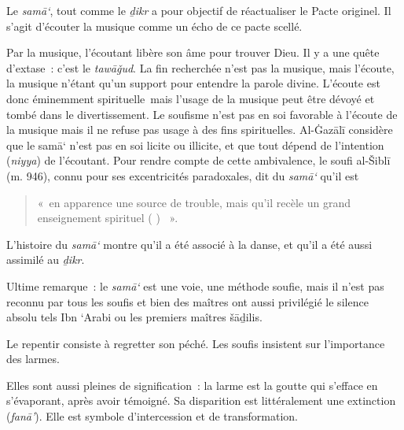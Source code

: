\begin{Def}[{samā`}]
Le \emph{samā`}, tout comme le \emph{ḏikr} a pour objectif de
réactualiser le Pacte originel. Il s'agit d'écouter la musique comme un
écho de ce pacte scellé. 
\end{Def}
Par la musique, l'écoutant libère son âme pour
trouver Dieu. Il y a une quête d'extase~: c'est le \emph{tawāǧud}. La
fin recherchée n'est pas la musique, mais l'écoute, la musique n'étant
qu'un support pour entendre la parole divine. L'écoute est donc
éminemment spirituelle~mais l'usage de la musique peut être dévoyé et
tombé dans le divertissement. Le soufisme n'est pas en soi favorable à
l'écoute de la musique mais il ne refuse pas usage à des fins
spirituelles. Al-Ġazālī  \label{theol:AlGazali28} considère que le samā` n'est pas en soi licite
ou illicite, et que tout dépend de l'intention (\emph{niyya}) de
l'écoutant. Pour rendre compte de cette ambivalence, le soufi al-Šiblī
(m. 946), connu pour ses excentricités paradoxales, dit du \emph{samā`}
qu'il est 
\begin{quote}
    «~en apparence une source de trouble, mais qu'il recèle un
grand enseignement spirituel (
)
~».
\end{quote}

L'histoire du \emph{samā`} montre qu'il a été associé à la danse, et
qu'il a été aussi assimilé au \emph{ḏikr}.

Ultime remarque~: le \emph{samā`} est une voie, une méthode soufie, mais
il n'est pas reconnu par tous les soufis et bien des maîtres ont aussi
privilégié le silence absolu tels Ibn `Arabi ou les premiers maîtres
šāḏilis.


Le repentir consiste à regretter son péché. Les soufis insistent sur
l'importance des larmes.

Elles sont aussi pleines de signification~: la larme est la goutte qui
s'efface en s'évaporant, après avoir témoigné. Sa disparition est
littéralement une extinction (\emph{fanā'}). Elle est symbole
d'intercession et de transformation.

